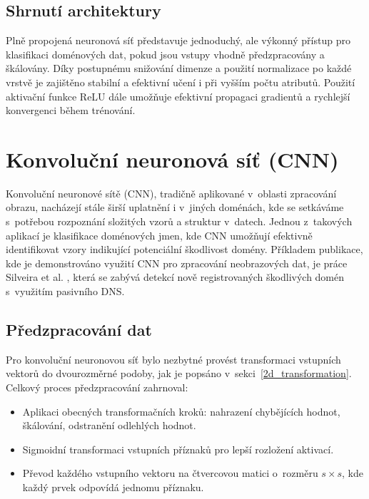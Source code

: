 \subsection{Shrnutí architektury}

Plně propojená neuronová síť představuje jednoduchý, ale výkonný přístup pro klasifikaci doménových dat, pokud jsou vstupy vhodně předzpracovány a škálovány. Díky postupnému snižování dimenze a použití normalizace po každé vrstvě je zajištěno stabilní a efektivní učení i při vyšším počtu atributů. Použití aktivační funkce ReLU dále umožňuje efektivní propagaci gradientů a rychlejší konvergenci během trénování.











\section{Konvoluční neuronová síť (CNN)}
Konvoluční neuronové sítě (CNN), tradičně aplikované v~oblasti zpracování obrazu, nacházejí stále širší uplatnění i v~jiných doménách, kde se setkáváme s~potřebou rozpoznání složitých vzorů a struktur v~datech. Jednou z~takových aplikací je klasifikace doménových jmen, kde CNN umožňují efektivně identifikovat vzory indikující potenciální škodlivost domény. Příkladem publikace, kde je demonstrováno využití CNN pro zpracování neobrazových dat, je práce Silveira et al. \cite{silveira2021detection}, která se zabývá detekcí nově registrovaných škodlivých domén s~využitím pasivního DNS.

\subsection{Předzpracování dat}
Pro konvoluční neuronovou síť bylo nezbytné provést  transformaci vstupních vektorů do dvourozměrné podoby, jak je popsáno v~sekci~\ref{2d_transformation}. Celkový proces předzpracování zahrnoval:

\begin{itemize}
    \item Aplikaci obecných transformačních kroků: nahrazení chybějících hodnot, škálování, odstranění odlehlých hodnot.
    \item Sigmoidní transformaci vstupních příznaků pro lepší rozložení aktivací.
    \item Převod každého vstupního vektoru na čtvercovou matici o~rozměru $s \times s$, kde každý prvek odpovídá jednomu příznaku.
\end{itemize}

